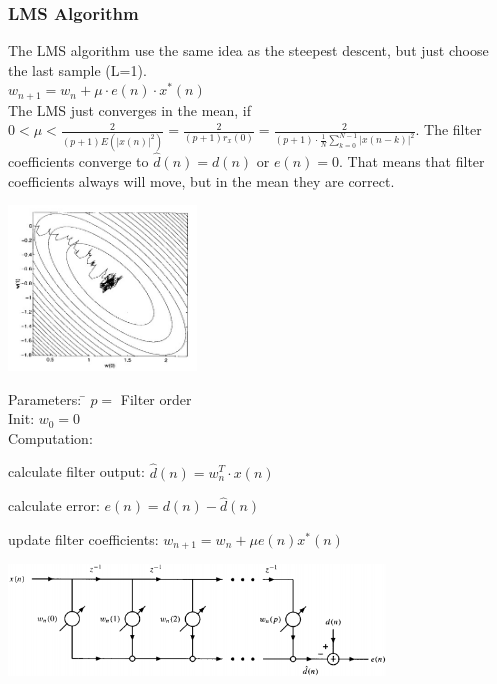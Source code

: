 \subsubsection{LMS Algorithm }
\begin{minipage}{14cm}

  The LMS algorithm use the same idea as the steepest descent, but just choose the last sample (L=1).\\
  $\boxed{ w_{n+1}=w_n+\mu \cdot e(n) \cdot x^*(n) }$\\
  
  The LMS just converges in the mean, if $\displaystyle 0<\mu< \frac{2}{(p+1)E\left(|x(n)|^2\right)}=\frac{2}{(p+1)r_x(0)}=\frac{2}{(p+1) \cdot \frac{1}{N} \sum\limits_{k=0}^{N-1}|x(n-k)|^2}$.
  The filter coefficients converge to $\hat d(n) = d(n)$ or $e(n) = 0$. 
  That means that filter coefficients always will move, but in the mean they are correct.
\end{minipage}
\begin{minipage}{5cm}
  \includegraphics[width=5cm]{../TSM_StatDig/bilder/LMS.jpg}
\end{minipage}

\begin{minipage}{9cm}
  \begin{tabbing}
  	Parameters:  \= $p= $ Filter order\\
  	Init:		\> $w_0= 0$\\
  	Computation:
  \end{tabbing}	
      \begin{aufzaehlung}
          \item calculate filter output: $\hat{d}(n) = w_n^T\cdot x(n)$ 
          \item calculate error: $e(n) = d(n) - \hat{d}(n)$
          \item update filter coefficients: $w_{n+1}=w_n+\mu e(n)x^*(n)$  
      \end{aufzaehlung}\vspace{0.05cm}

\end{minipage} 
\begin{minipage}{10cm}
  \includegraphics[width=10cm]{../TSM_StatDig/bilder/adaptiveFirStructure.png}
\end{minipage}

